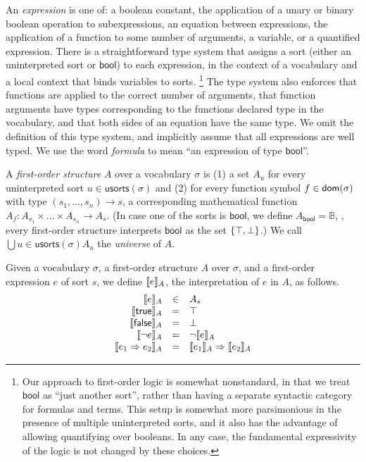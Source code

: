 An \emph{expression} is one of: a boolean constant,
  the application of a unary or binary boolean operation to subexpressions,
  an equation between expressions,
  the application of a function to some number of arguments,
  a variable,
  or a quantified expression.
There is a straightforward type system
  that assigns a sort (either an uninterpreted sort or $\mathsf{bool}$) to each expression,
  in the context of a vocabulary and a local context that binds variables to sorts.%
\footnote{Our approach to first-order logic is somewhat nonstandard,
in that we treat $\mathsf{bool}$ as ``just another sort'',
rather than having a separate syntactic category for formulas and terms.
This setup is somewhat more parsimonious in the presence of multiple uninterpreted sorts,
and it also has the advantage of allowing quantifying over booleans.
In any case, the fundamental expressivity of the logic is not changed by these choices.}
The type system also enforces that functions are applied to the correct number of arguments,
  that function arguments have types corresponding to the functions declared type in the vocabulary,
  and that both sides of an equation have the same type.
We omit the definition of this type system, and implicitly assume that all expressions are well typed.
We use the word \emph{formula} to mean ``an expression of type $\mathsf{bool}$''.

A \emph{first-order structure} $A$ over a vocabulary $\sigma$ is
 (1) a set $A_u$ for every uninterpreted sort $u\in\mathsf{usorts}(\sigma)$ and
 (2) for every function symbol $f\in\mathsf{dom}(\sigma)$
     with type $(s_1, \dots, s_n)\to s$,
     a corresponding mathematical function
     $A_f : A_{s_1} \times \dots \times A_{s_n} \to A_s$.
(In case one of the sorts is $\mathsf{bool}$, we define
  $A_{\mathsf{bool}} = \mathbb{B}$,
  \ie, every first-order structure interprets $\mathsf{bool}$
  as the set $\left\{{\top,\bot}\right\}$.)
We call $\bigcup{u\in\mathsf{usorts}(\sigma)} A_u$ the \emph{universe} of $A$.

Given a vocabulary $\sigma$,
  a first-order structure $A$ over $\sigma$,
  and a first-order expression $e$ of sort $s$,
  we define $\llbracket{e}\rrbracket_A$,
  the interpretation of $e$ in $A$, as follows.
\begin{gather*}
  \begin{array}{rcl}
  \llbracket{e}\rrbracket_A &\in& A_s\\
  \llbracket{\mathsf{true}}\rrbracket_A &=& \top\\
  \llbracket{\mathsf{false}}\rrbracket_A &=& \bot\\
  \llbracket{\lnot e}\rrbracket_A &=& \lnot \llbracket{e}\rrbracket_A\\
  \llbracket{e_1 \Rightarrow e_2}\rrbracket_A &=& \llbracket{e_1}\rrbracket_A \Rightarrow \llbracket{e_2}\rrbracket_A\\
  \end{array}
\end{gather*}

